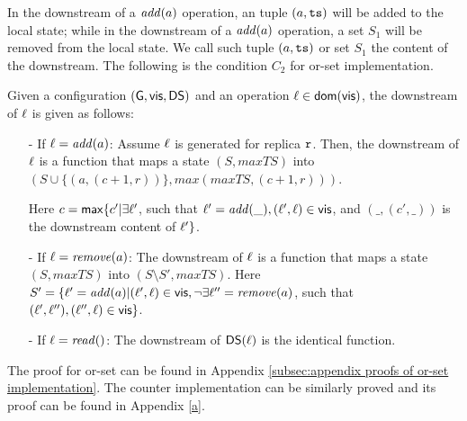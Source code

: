 In the downstream of a $\alabellongNoret[\mathit{add}]{\argv}$ operation, an tuple $(\argv,\ats)$ will be added to the local state; while in the downstream of a $\alabellongNoret[\mathit{add}]{\argv}$ operation, a set $S_1$ will be removed from the local state. We call such tuple $(\argv,\ats)$ or set $S_1$ the content of the downstream. The following is the condition $C_2$ for or-set implementation.

\begin{example}
\label{example:condition c2 for or-set implementation}
Given a configuration $(\gstates, \avisord, \downstreams)$ and an operation $\alabel \in \dom{\avisord}$, the downstream of $\alabel$ is given as follows: 

\begin{itemize}
\setlength{\itemsep}{0.5pt}
\item[-] If $\alabel = \alabellongNoret[\mathit{add}]{\argv}$: Assume $\alabel$ is generated for replica $\arep$. Then, the downstream of $\alabel$ is a function that maps a state $(S,\mathit{maxTS})$ into $(S \cup \{ (a,(c+1,r)) \}, \mathit{max}(\mathit{maxTS},(c+1,r)))$.  
    
    Here $c = \mathsf{max}\{ c' \vert \exists \alabel'$, such that $\alabel' = \alabellongNoret[\mathit{add}]{\_}, (\alabel', \alabel) \in \avisord$, and $(\_,(c',\_))$ is the downstream content of $\alabel' \}$. 

\item[-] If $\alabel = \alabellongNoret[\mathit{remove}]{\argv}$: The downstream of $\alabel$ is a function that maps a state $(S,\mathit{maxTS})$ into $(S \setminus S', \mathit{maxTS})$. 
    Here $S' = \{ \alabel' = \alabellongNoret[\mathit{add}]{\argv} \vert (\alabel',\alabel) \in \avisord, \neg \exists \alabel'' = \alabellongNoret[\mathit{remove}]{\argv}$, such that $(\alabel',\alabel''), (\alabel'',\alabel) \in \avisord \}$. 

\item[-] If $\alabel = \alabellongNoret[\mathit{read}]{}$: The downstream of $\downstreams(\alabel)$ is the identical function. 
\end{itemize}
\end{example}

The proof for or-set can be found in Appendix \ref{subsec:appendix proofs of or-set implementation}. The counter implementation can be similarly proved and its proof can be found in Appendix \ref{a}.




